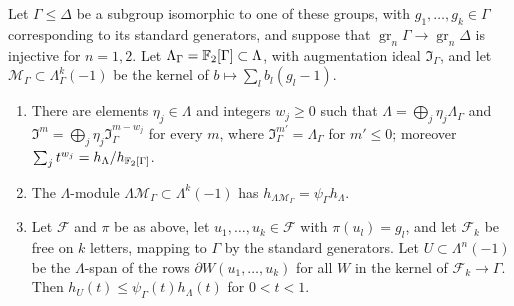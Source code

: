 \begin{lemma}\label{tw:filtered-local-freeness}
Let $\Gamma\le\Delta$ be a subgroup isomorphic to one of these groups, with
$g_1,\dots,g_k\in\Gamma$ corresponding to its standard generators, and
suppose that $\operatorname{gr}_n\Gamma\to\operatorname{gr}_n\Delta$ is
injective for $n=1,2$. Let $\Lambda_\Gamma=\mathbb F_2[\Gamma]\subset\Lambda$, with
augmentation ideal $\mathfrak I_\Gamma$, and let
$\mathcal M_\Gamma\subset\Lambda_\Gamma^k(-1)$ be the kernel of
$b\mapsto\sum_lb_l(g_l-1)$.
\begin{enumerate}
\item[(a)] There are elements $\eta_j\in\Lambda$ and integers $w_j\ge0$ such
 that $\Lambda=\bigoplus_j\eta_j\Lambda_\Gamma$ and
 $\mathfrak I^m=\bigoplus_j\eta_j\mathfrak I_\Gamma^{m-w_j}$ for every $m$,
 where $\mathfrak I_\Gamma^{m'}=\Lambda_\Gamma$ for $m'\le0$; moreover
 $\sum_jt^{w_j}=h_\Lambda/h_{\mathbb F_2[\Gamma]}$.
\item[(b)] The $\Lambda$-module $\Lambda\mathcal M_\Gamma\subset\Lambda^k(-1)$
 has $h_{\Lambda\mathcal M_\Gamma}=\psi_\Gamma h_\Lambda$.
\item[(c)] Let $\mathcal F$ and $\pi$ be as above, let
 $u_1,\dots,u_k\in\mathcal F$ with $\pi(u_l)=g_l$, and let $\mathcal F_k$ be
 free on $k$ letters, mapping to $\Gamma$ by the standard generators. Let
 $U\subset\Lambda^n(-1)$ be the $\Lambda$-span of the rows
 $\partial W(u_1,\dots,u_k)$ for all $W$ in the kernel of
 $\mathcal F_k\to\Gamma$. Then $h_U(t)\le\psi_\Gamma(t)h_\Lambda(t)$ for
 $0<t<1$.
\end{enumerate}
\end{lemma}

